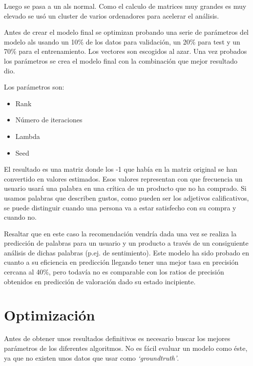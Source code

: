 \documentclass[withindex, glossary]{cam-thesis}
\begin{document}
Luego se pasa a un \acrshort{als} normal. Como el calculo de matrices muy grandes es muy elevado se usó un cluster de varios ordenadores para acelerar el análisis.

Antes de crear el modelo final se optimizan probando una serie de parámetros del modelo \acrshort{als} usando un 10\% de los datos para validación, un 20\% para test y un 70\% para el entrenamiento. Los vectores son escogidos al azar. Una vez probados los parámetros se crea el modelo final con la combinación que mejor resultado dio.

Los parámetros son:

\begin{multicols}{2}
    \begin{itemize}
        \item Rank
        \item Número de iteraciones
        \item Lambda
        \item Seed
    \end{itemize}
\end{multicols}

El resultado es una matriz donde los -1 que había en la matriz original se han convertido en valores estimados. Esos valores representan con que frecuencia un usuario usará una palabra en una crítica de un producto que no ha comprado. Si usamos palabras que describen gustos, como pueden ser los adjetivos calificativos, se puede distinguir cuando una persona va a estar satisfecho con su compra y cuando no.

Resaltar que en este caso la recomendación vendría dada una vez se realiza la predicción de palabras para un usuario y un producto a través de un consiguiente análisis de dichas palabras (p.ej. de sentimiento). Este modelo ha sido probado en cuanto a su eficiencia en predicción\cite{emodelo} llegando tener una mejor tasa en precisión cercana al 40\%, pero todavía no es comparable con los ratios de precisión obtenidos en predicción de valoración dado su estado incipiente.

\chapter{Optimización}\label{chap:opt}
Antes de obtener unos resultados definitivos es necesario buscar los mejores parámetros de los diferentes algoritmos. No es fácil evaluar un modelo como éste, ya que no existen unos datos que usar como \textit{`\gls{groundtruth}'}.
\end{document}

